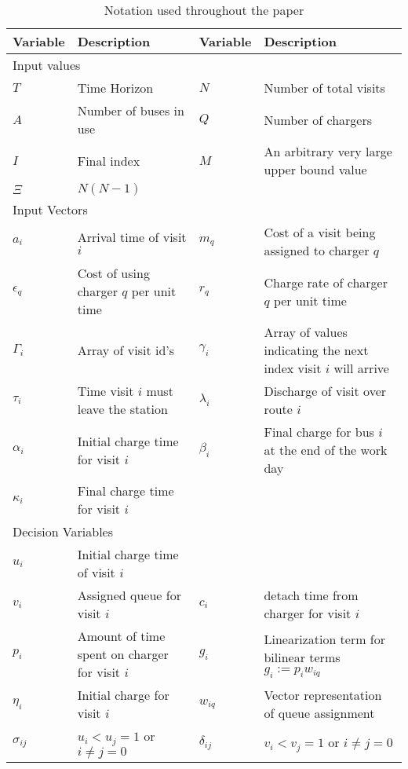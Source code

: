 \documentclass[letterpaper, 10pt, conference]{IEEEtran}
\begin{document}
\begin{table*}[!t]
	\caption{Notation used throughout the paper}
	\label{tab:variables}
	\centering
	\begin{tabular}{l l l l}
		\toprule
		\textbf{Variable} & \textbf{Description} & \textbf{Variable} & \textbf{Description} \\
		\toprule
		\multicolumn{4}{l}{Input values} \\
			$T$         & Time Horizon           &
			$N$         & Number of total visits                    \\
			$A$         & Number of buses in use &
			$Q$         & Number of chargers                        \\
			$I$         & Final index            &
			$M$         & An arbitrary very large upper bound value \\
			$\Xi$       & $N(N-1)$                                   \\
		\hline
		\multicolumn{4}{l}{Input Vectors} \\
			$a_i$        & Arrival time of visit  $i$              &
			$m_q$        & Cost of a visit being assigned to charger  $q$                  \\
			$\epsilon_q$ & Cost of using charger $q$ per unit time &
			$r_q$        & Charge rate of charger $q$ per unit time                        \\
			$\Gamma_i$   & Array of visit id's                     &
			$\gamma_i$   & Array of values indicating the next index visit $i$ will arrive \\
			$\tau_i$     & Time visit $i$ must leave the station   &
			$\lambda_i$  & Discharge of visit over route  $i$                              \\
			$\alpha_i$   & Initial charge time for visit  $i$      &
			$\beta_{i}$  & Final charge for bus $i$ at the end of the work day             \\
			$\kappa_i$   & Final charge time for visit $i$                                 \\
		\hline
		\multicolumn{4}{l}{Decision Variables} \\
			$u_i$         & Initial charge time of visit $i$                          \\
			$v_i$         & Assigned queue for visit $i$                  &
			$c_i$         & detach time from charger for visit $i$                    \\
			$p_i$         & Amount of time spent on charger for visit $i$ &
			$g_i$         & Linearization term for bilinear terms $g_i := p_i w_{iq}$ \\
			$\eta_i$      & Initial charge for visit $i$                  &
			$w_{iq}$      & Vector representation of queue assignment                 \\
			$\sigma_{ij}$ & $u_i < u_j = 1$ \textrm{ or } $i \neq j = 0$  &
			$\delta_{ij}$ & $v_i < v_j = 1$ \textrm{ or } $i \neq j = 0$              \\
			\bottomrule
	\end{tabular}
\end{table*}
\end{document}
